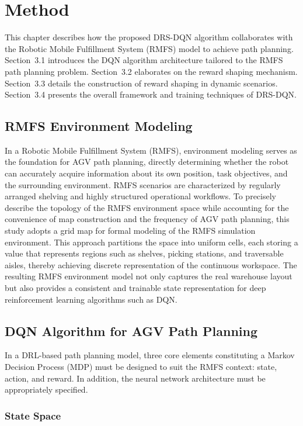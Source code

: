 \section{Method}

This chapter describes how the proposed DRS-DQN algorithm collaborates with the Robotic Mobile Fulfillment System (RMFS) model to achieve path planning. Section~3.1 introduces the DQN algorithm architecture tailored to the RMFS path planning problem. Section~3.2 elaborates on the reward shaping mechanism. Section~3.3 details the construction of reward shaping in dynamic scenarios. Section~3.4 presents the overall framework and training techniques of DRS-DQN.

\subsection{RMFS Environment Modeling}

In a Robotic Mobile Fulfillment System (RMFS), environment modeling serves as the foundation for AGV path planning, directly determining whether the robot can accurately acquire information about its own position, task objectives, and the surrounding environment. RMFS scenarios are characterized by regularly arranged shelving and highly structured operational workflows. To precisely describe the topology of the RMFS environment space while accounting for the convenience of map construction and the frequency of AGV path planning, this study adopts a grid map for formal modeling of the RMFS simulation environment. This approach partitions the space into uniform cells, each storing a value that represents regions such as shelves, picking stations, and traversable aisles, thereby achieving discrete representation of the continuous workspace. The resulting RMFS environment model not only captures the real warehouse layout but also provides a consistent and trainable state representation for deep reinforcement learning algorithms such as DQN.

\subsection{DQN Algorithm for AGV Path Planning}

In a DRL-based path planning model, three core elements constituting a Markov Decision Process (MDP) must be designed to suit the RMFS context: state, action, and reward. In addition, the neural network architecture must be appropriately specified.

\subsubsection{State Space}

